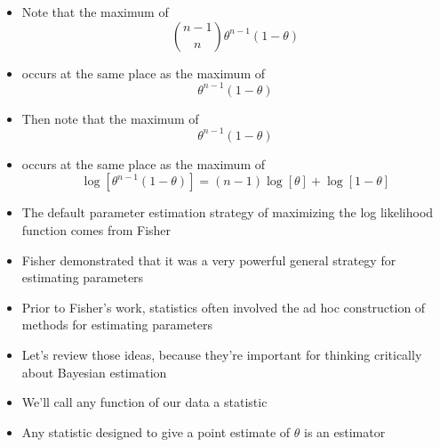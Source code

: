 \documentclass{beamer}
\begin{document}
\frame
{
  \begin{itemize}
    \item{Note that the maximum of}
  \[
  \binom{n - 1}{n} \theta ^ {n - 1} (1 - \theta)
  \]
    \item{occurs at the same place as the maximum of}
  \[
  \theta ^ {n - 1} (1 - \theta)
  \]
  \end{itemize}
}

\frame
{
  \begin{itemize}
    \item{Then note that the maximum of}
  \[
  \theta ^ {n - 1} (1 - \theta)
  \]
    \item{occurs at the same place as the maximum of}
  \[
  \log[\theta ^ {n - 1} (1 - \theta)] = (n -1) \log[\theta] + \log[1 - \theta]
  \]
  \end{itemize}
}


\frame
{
  \begin{itemize}
    \item{The default parameter estimation strategy of maximizing the log likelihood function comes from Fisher}
    \item{Fisher demonstrated that it was a very powerful general strategy for estimating parameters}
  \end{itemize}
}

\frame
{
  \begin{itemize}
    \item{Prior to Fisher's work, statistics often involved the ad hoc construction of methods for estimating parameters}
    \item{Let's review those ideas, because they're important for thinking critically about Bayesian estimation}
  \end{itemize}
}

\frame
{
  \begin{itemize}
    \item{We'll call any function of our data a statistic}
    \item{Any statistic designed to give a point estimate of $\theta$ is an estimator}
  \end{itemize}
}
\end{document}
